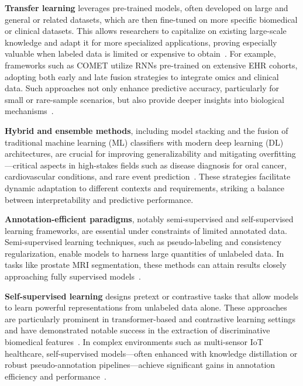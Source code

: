 \documentclass[sigconf]{acmart}
\begin{document}
\textbf{Transfer learning} leverages pre-trained models, often developed on large and general or related datasets, which are then fine-tuned on more specific biomedical or clinical datasets. This allows researchers to capitalize on existing large-scale knowledge and adapt it for more specialized applications, proving especially valuable when labeled data is limited or expensive to obtain~\cite{ref31, ref33, ref54, ref55, ref65, ref90, ref76}. For example, frameworks such as COMET utilize RNNs pre-trained on extensive EHR cohorts, adopting both early and late fusion strategies to integrate omics and clinical data. Such approaches not only enhance predictive accuracy, particularly for small or rare-sample scenarios, but also provide deeper insights into biological mechanisms~\cite{ref49}.

\textbf{Hybrid and ensemble methods}, including model stacking and the fusion of traditional machine learning (ML) classifiers with modern deep learning (DL) architectures, are crucial for improving generalizability and mitigating overfitting—critical aspects in high-stakes fields such as disease diagnosis for oral cancer, cardiovascular conditions, and rare event prediction~\cite{ref16, ref50, ref53, ref54, ref62, ref71, ref90}. These strategies facilitate dynamic adaptation to different contexts and requirements, striking a balance between interpretability and predictive performance.

\textbf{Annotation-efficient paradigms}, notably semi-supervised and self-supervised learning frameworks, are essential under constraints of limited annotated data. Semi-supervised learning techniques, such as pseudo-labeling and consistency regularization, enable models to harness large quantities of unlabeled data. In tasks like prostate MRI segmentation, these methods can attain results closely approaching fully supervised models~\cite{ref61, ref76, ref77}.

\textbf{Self-supervised learning} designs pretext or contrastive tasks that allow models to learn powerful representations from unlabeled data alone. These approaches are particularly prominent in transformer-based and contrastive learning settings and have demonstrated notable success in the extraction of discriminative biomedical features~\cite{ref41, ref55, ref64, ref76, ref106}. In complex environments such as multi-sensor IoT healthcare, self-supervised models—often enhanced with knowledge distillation or robust pseudo-annotation pipelines—achieve significant gains in annotation efficiency and performance~\cite{ref49, ref51, ref54, ref65, ref76, ref77, ref90, ref106}.
\end{document}
